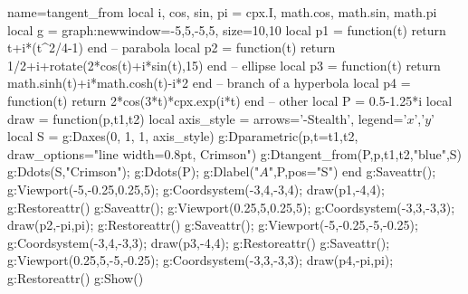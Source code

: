 \begin{luadraw}{name=tangent_from}
local i, cos, sin, pi = cpx.I, math.cos, math.sin, math.pi
local g = graph:new{window={-5,5,-5,5}, size={10,10}}
local p1 = function(t) return t+i*(t^2/4-1) end -- parabola
local p2 = function(t) return 1/2+i+rotate(2*cos(t)+i*sin(t),15) end -- ellipse
local p3 = function(t) return math.sinh(t)+i*math.cosh(t)-i*2 end -- branch of a hyperbola
local p4 = function(t) return 2*cos(3*t)*cpx.exp(i*t) end -- other
local P = 0.5-1.25*i
local draw = function(p,t1,t2)
    local axis_style = { arrows='-Stealth', legend={'$x$','$y$'} }
    local S = {}
    g:Daxes({0, 1, 1}, axis_style)
    g:Dparametric(p,{t={t1,t2}, draw_options="line width=0.8pt, Crimson"})
    g:Dtangent_from(P,p,t1,t2,"blue",S)
    g:Ddots(S,"Crimson"); g:Ddots(P); g:Dlabel("$A$",P,{pos="S"})
end
g:Saveattr(); g:Viewport(-5,-0.25,0.25,5); g:Coordsystem(-3,4,-3,4); draw(p1,-4,4); g:Restoreattr()
g:Saveattr(); g:Viewport(0.25,5,0.25,5); g:Coordsystem(-3,3,-3,3); draw(p2,-pi,pi); g:Restoreattr()
g:Saveattr(); g:Viewport(-5,-0.25,-5,-0.25); g:Coordsystem(-3,4,-3,3); draw(p3,-4,4); g:Restoreattr()
g:Saveattr(); g:Viewport(0.25,5,-5,-0.25); g:Coordsystem(-3,3,-3,3); draw(p4,-pi,pi); g:Restoreattr()
g:Show()
\end{luadraw}
